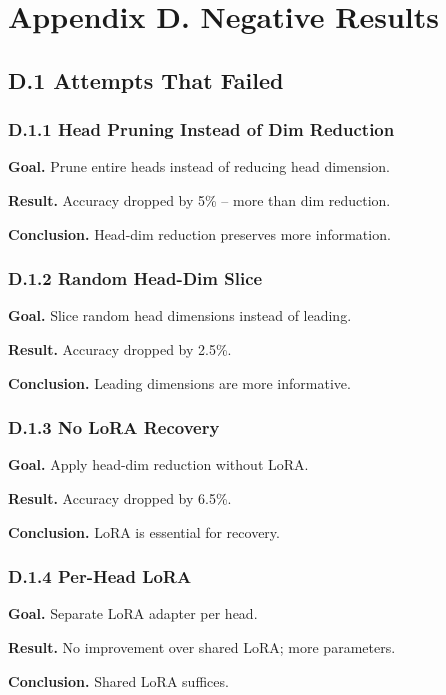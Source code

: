
\section{Appendix D. Negative Results}

\subsection{D.1 Attempts That Failed}

\subsubsection{D.1.1 Head Pruning Instead of Dim Reduction}

\textbf{Goal.} Prune entire heads instead of reducing head dimension.

\textbf{Result.} Accuracy dropped by 5\% -- more than dim reduction.

\textbf{Conclusion.} Head-dim reduction preserves more information.

\subsubsection{D.1.2 Random Head-Dim Slice}

\textbf{Goal.} Slice random head dimensions instead of leading.

\textbf{Result.} Accuracy dropped by 2.5\%.

\textbf{Conclusion.} Leading dimensions are more informative.

\subsubsection{D.1.3 No LoRA Recovery}

\textbf{Goal.} Apply head-dim reduction without LoRA.

\textbf{Result.} Accuracy dropped by 6.5\%.

\textbf{Conclusion.} LoRA is essential for recovery.

\subsubsection{D.1.4 Per-Head LoRA}

\textbf{Goal.} Separate LoRA adapter per head.

\textbf{Result.} No improvement over shared LoRA; more parameters.

\textbf{Conclusion.} Shared LoRA suffices.

